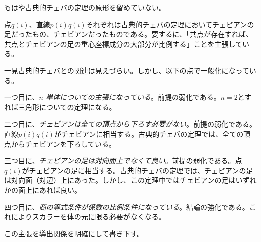 \documentclass[a4paper,12pt]{bxjsbook}
\newlength{\customindent}
\newenvironment{body}{
  \par
  \begingroup
  \setlength{\leftskip}{\customindent}
  \setlength{\rightskip}{0pt}
  \setlength{\parindent}{1em}
  \setlength{\displayindent}{\customindent}
  \setlength{\displaywidth}{\dimexpr\linewidth-\customindent\relax}
}{
  \par
  \endgroup
}
\theoremstyle{theorem}
\begin{document}
    \begin{body}
        \indent もはや古典的チェバの定理の原形を留めていない。

        \indent 点$q(i)$、直線$p(i)q(i)$それぞれは古典的チェバの定理においてチェビアンの足だったもの、チェビアンだったものである。要するに、「共点が存在すれば、共点とチェビアンの足の重心座標成分の大部分が比例する」ことを主張している。

        \indent 一見古典的チェバとの関連は見えづらい。しかし、以下の点で一般化になっている。

        \indent 一つ目に、\emph{$n$-単体についての主張になっている}。前提の弱化である。$n=2$とすれば三角形についての定理になる。

        \indent 二つ目に、\emph{チェビアンは全ての頂点から下ろす必要がない}。前提の弱化である。直線$p(i)q(i)$がチェビアンに相当する。古典的チェバの定理では、全ての頂点からチェビアンを下ろしている。

        \indent 三つ目に、\emph{チェビアンの足は対向面上でなくて良い}。前提の弱化である。点$q(i)$がチェビアンの足に相当する。古典的チェバの定理では、チェビアンの足は対向面（対辺）上にあった。しかし、この定理中ではチェビアンの足はいずれかの面上にあれば良い。

        \indent 四つ目に、\emph{商の等式条件が係数の比例条件になっている}。結論の強化である。これによりスカラーを体の元に限る必要がなくなる。

        \indent この主張を導出関係を明確にして書き下す。

    \end{body}
\end{document}

